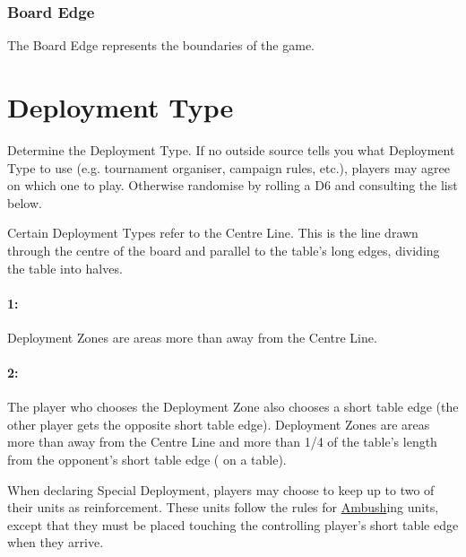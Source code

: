 \subsubsection{Board Edge}
\label{board_edge}

The Board Edge represents the boundaries of the game. 

\section{Deployment Type}
\label{deployment_type}

Determine the Deployment Type. If no outside source tells you what Deployment Type to use (e.g. tournament organiser, campaign rules, etc.), players may agree on which one to play. Otherwise randomise by rolling a D6 and consulting the list below.

Certain Deployment Types refer to the Centre Line. This is the line drawn through the centre of the board and parallel to the table's long edges, dividing the table into halves.

\begin{minipage}{0.65\textwidth}
\hypertarget{frontline_clash}{\paragraph{1\spacebeforecolon{}: \frontlineclash}}
\label{figure/deployment}
\vspace*{0.5ex}

Deployment Zones are areas more than  away from the Centre Line.
\end{minipage}\hfill\begin{minipage}{0.32\textwidth}
\def\svgwidth{\textwidth}

\end{minipage}

\begin{minipage}{0.65\textwidth}
\hypertarget{dawn_assault}{\paragraph{2\spacebeforecolon{}: \dawnassault}}
\vspace*{0.5ex}

The player who chooses the Deployment Zone also chooses a short table edge (the other player gets the opposite short table edge). Deployment Zones are areas more than  away from the Centre Line and more than 1/4 of the table's length from the opponent's short table edge ( on a  table).

When declaring Special Deployment, players may choose to keep up to two of their units as reinforcement. These units follow the rules for \hyperref[ambush]{Ambush}ing units, except that they must be placed touching the controlling player's short table edge when they arrive.
\end{minipage}\hfill\begin{minipage}{0.32\textwidth}
\def\svgwidth{\textwidth}

\end{minipage}

